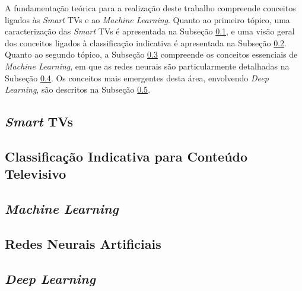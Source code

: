 
A fundamentação teórica para a realização deste trabalho compreende conceitos ligados às  \emph{Smart} TVs e ao \emph{Machine Learning}. Quanto ao primeiro tópico, uma caracterização das \emph{Smart} TVs é apresentada na Subseção \ref{sec:smarttv}, e uma visão geral dos conceitos ligados à classificação indicativa é apresentada na Subseção \ref{sec:classificacaoIndicativa}. Quanto ao segundo tópico, a Subseção \ref{sec:machineLearning} compreende os conceitos essenciais de \emph{Machine Learning}, em que as redes neurais são particularmente detalhadas na Subseção \ref{sec:rnas}. Os conceitos mais emergentes desta área, envolvendo \emph{Deep Learning}, são descritos na Subseção \ref{sec:dl}.

\subsection{\emph{Smart} TVs} \label{sec:smarttv}


\subsection{Classificação Indicativa para Conteúdo Televisivo} \label{sec:classificacaoIndicativa}


\subsection{\emph{Machine Learning}} \label{sec:machineLearning}


\subsection{Redes Neurais Artificiais} \label{sec:rnas}


\subsection{\emph{Deep Learning}}\label{sec:dl}

